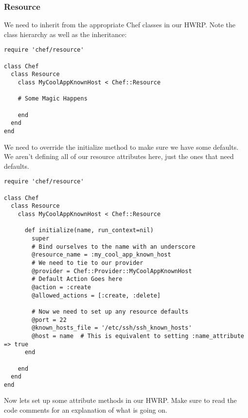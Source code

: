 \subsubsection{Resource}

We need to inherit from the appropriate Chef classes in our HWRP. Note the class hierarchy as well as the inheritance:

\begin{lstlisting}[label=lst:cookbook-hwrp2]
require 'chef/resource'

class Chef
  class Resource
    class MyCoolAppKnownHost < Chef::Resource

    # Some Magic Happens

    end
  end
end
\end{lstlisting}

We need to override the initialize method to make sure we have some defaults. We aren't defining all of our resource attributes here, just the ones that need defaults.

\begin{lstlisting}[label=lst:cookbook-hwrp3]
require 'chef/resource'

class Chef
  class Resource
    class MyCoolAppKnownHost < Chef::Resource

      def initialize(name, run_context=nil)
        super
        # Bind ourselves to the name with an underscore
        @resource_name = :my_cool_app_known_host
        # We need to tie to our provider
        @provider = Chef::Provider::MyCoolAppKnownHost
        # Default Action Goes here
        @action = :create
        @allowed_actions = [:create, :delete]

        # Now we need to set up any resource defaults
        @port = 22
        @known_hosts_file = '/etc/ssh/ssh_known_hosts'
        @host = name  # This is equivalent to setting :name_attribute => true
      end

    end
  end
end
\end{lstlisting}

Now lets set up some attribute methods in our HWRP. Make sure to read the code comments for an explanation of what is going on.

